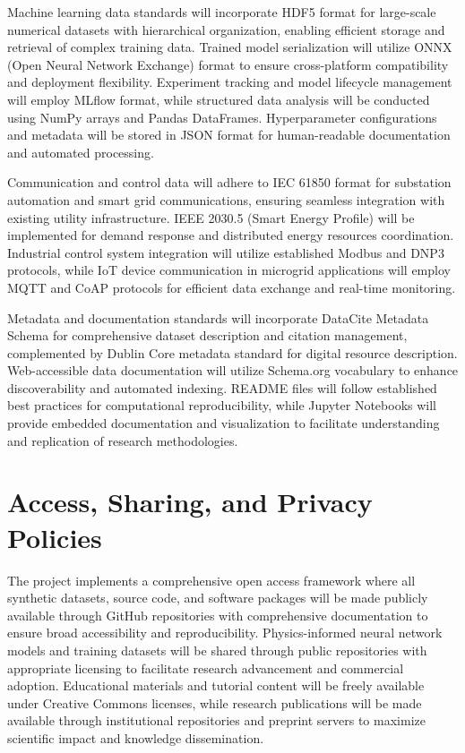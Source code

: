 \documentclass[12pt]{article}
\begin{document}
Machine learning data standards will incorporate HDF5 format for large-scale numerical datasets with hierarchical organization, enabling efficient storage and retrieval of complex training data. Trained model serialization will utilize ONNX (Open Neural Network Exchange) format to ensure cross-platform compatibility and deployment flexibility. Experiment tracking and model lifecycle management will employ MLflow format, while structured data analysis will be conducted using NumPy arrays and Pandas DataFrames. Hyperparameter configurations and metadata will be stored in JSON format for human-readable documentation and automated processing.

Communication and control data will adhere to IEC 61850 format for substation automation and smart grid communications, ensuring seamless integration with existing utility infrastructure. IEEE 2030.5 (Smart Energy Profile) will be implemented for demand response and distributed energy resources coordination. Industrial control system integration will utilize established Modbus and DNP3 protocols, while IoT device communication in microgrid applications will employ MQTT and CoAP protocols for efficient data exchange and real-time monitoring.

Metadata and documentation standards will incorporate DataCite Metadata Schema for comprehensive dataset description and citation management, complemented by Dublin Core metadata standard for digital resource description. Web-accessible data documentation will utilize Schema.org vocabulary to enhance discoverability and automated indexing. README files will follow established best practices for computational reproducibility, while Jupyter Notebooks will provide embedded documentation and visualization to facilitate understanding and replication of research methodologies.

\section{Access, Sharing, and Privacy Policies}

The project implements a comprehensive open access framework where all synthetic datasets, source code, and software packages will be made publicly available through GitHub repositories with comprehensive documentation to ensure broad accessibility and reproducibility. Physics-informed neural network models and training datasets will be shared through public repositories with appropriate licensing to facilitate research advancement and commercial adoption. Educational materials and tutorial content will be freely available under Creative Commons licenses, while research publications will be made available through institutional repositories and preprint servers to maximize scientific impact and knowledge dissemination.
\end{document}
